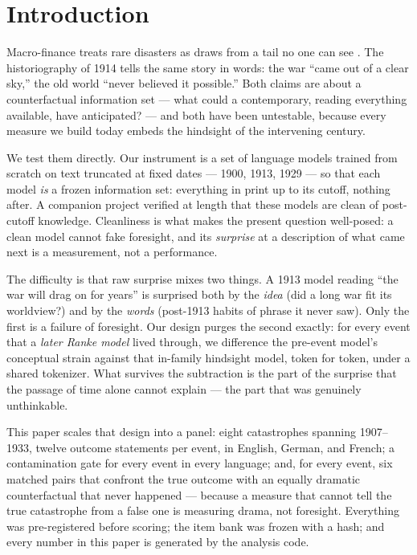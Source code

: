 \documentclass[11pt]{article}
\begin{document}
\section{Introduction}

Macro-finance treats rare disasters as draws from a tail no one can see \citep{rietz1988, barro2006}. The
historiography of 1914 tells the same story in words: the war ``came out of a clear sky,'' the old world
``never believed it possible.'' Both claims are about a counterfactual information set --- what could a
contemporary, reading everything available, have anticipated? --- and both have been untestable, because
every measure we build today embeds the hindsight of the intervening century.

We test them directly. Our instrument is a set of language models trained from scratch on text truncated
at fixed dates --- 1900, 1913, 1929 --- so that each model \emph{is} a frozen information set: everything
in print up to its cutoff, nothing after. A companion project verified at length that these models are
clean of post-cutoff knowledge. Cleanliness is what makes the present question well-posed: a clean model
cannot fake foresight, and its \emph{surprise} at a description of what came next is a measurement, not a
performance.

The difficulty is that raw surprise mixes two things. A 1913 model reading ``the war will drag on for
years'' is surprised both by the \emph{idea} (did a long war fit its worldview?) and by the \emph{words}
(post-1913 habits of phrase it never saw). Only the first is a failure of foresight. Our design purges the
second exactly: for every event that a \emph{later Ranke model} lived through, we difference the pre-event
model's conceptual strain against that in-family hindsight model, token for token, under a shared
tokenizer. What survives the subtraction is the part of the surprise that the passage of time alone cannot
explain --- the part that was genuinely unthinkable.

This paper scales that design into a panel: eight catastrophes spanning 1907--1933, twelve outcome
statements per event, in English, German, and French; a contamination gate for every event in every
language; and, for every event, six matched pairs that confront the true outcome with an equally dramatic
counterfactual that never happened --- because a measure that cannot tell the true catastrophe from a
false one is measuring drama, not foresight. Everything was pre-registered before scoring; the item bank
was frozen with a hash; and every number in this paper is generated by the analysis code.
\end{document}
